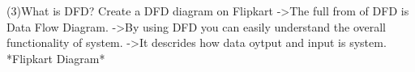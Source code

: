 (3)What is DFD? Create a DFD diagram on Flipkart
->The full from of DFD is Data Flow Diagram.
->By using DFD you can easily understand the overall functionality of system.
->It descrides how data oytput and input is system.
                                                          *Flipkart Diagram*
 
